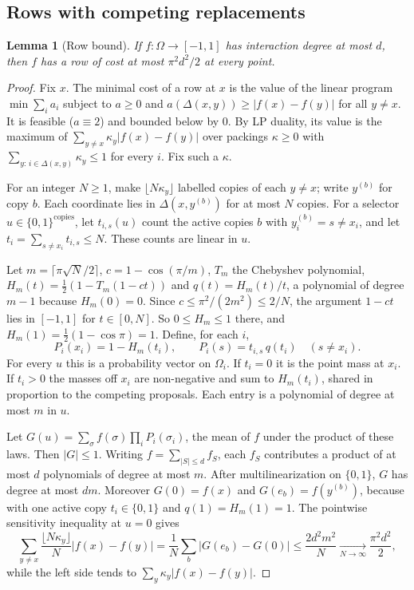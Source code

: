\documentclass[11pt]{article}
\numberwithin{equation}{section}
\newtheorem{lemma}[theorem]{Lemma}
\theoremstyle{definition}
\theoremstyle{remark}
\newcommand{\1}{\mathbf 1}
\begin{document}
\subsection{Rows with competing replacements}
\begin{lemma}[Row bound]\label{lem:rowbound}
If $f:\Omega\to[-1,1]$ has interaction degree at most $d$, then $f$ has a row of cost at most $\pi^2d^2/2$ at every point.
\end{lemma}
\begin{proof}
Fix $x$. The minimal cost of a row at $x$ is the value of the linear program $\min\sum_ia_i$ subject to $a\ge0$ and $a(\Delta(x,y))\ge|f(x)-f(y)|$ for all $y\ne x$. It is feasible ($a\equiv2$) and bounded below by $0$. By LP duality, its value is the maximum of $\sum_{y\ne x}\kappa_y|f(x)-f(y)|$ over packings $\kappa\ge0$ with $\sum_{y:\,i\in\Delta(x,y)}\kappa_y\le1$ for every $i$. Fix such a $\kappa$.

For an integer $N\ge1$, make $\lfloor N\kappa_y\rfloor$ labelled copies of each $y\ne x$; write $y^{(b)}$ for copy $b$. Each coordinate lies in $\Delta(x,y^{(b)})$ for at most $N$ copies. For a selector $u\in\{0,1\}^{\mathrm{copies}}$, let $t_{i,s}(u)$ count the active copies $b$ with $y^{(b)}_i=s\ne x_i$, and let $t_i=\sum_{s\ne x_i}t_{i,s}\le N$. These counts are linear in $u$.

Let $m=\lceil\pi\sqrt N/2\rceil$, $c=1-\cos(\pi/m)$, $T_m$ the Chebyshev polynomial, $H_m(t)=\frac12(1-T_m(1-ct))$ and $q(t)=H_m(t)/t$, a polynomial of degree $m-1$ because $H_m(0)=0$. Since $c\le\pi^2/(2m^2)\le2/N$, the argument $1-ct$ lies in $[-1,1]$ for $t\in[0,N]$. So $0\le H_m\le1$ there, and $H_m(1)=\frac12(1-\cos\pi)=1$. Define, for each $i$,
\[
P_i(x_i)=1-H_m(t_i),\qquad P_i(s)=t_{i,s}\,q(t_i)\quad(s\ne x_i).
\]
For every $u$ this is a probability vector on $\Omega_i$. If $t_i=0$ it is the point mass at $x_i$. If $t_i>0$ the masses off $x_i$ are non-negative and sum to $H_m(t_i)$, shared in proportion to the competing proposals. Each entry is a polynomial of degree at most $m$ in $u$.

Let $G(u)=\sum_\sigma f(\sigma)\prod_iP_i(\sigma_i)$, the mean of $f$ under the product of these laws. Then $|G|\le1$. Writing $f=\sum_{|S|\le d}f_S$, each $f_S$ contributes a product of at most $d$ polynomials of degree at most $m$. After multilinearization on $\{0,1\}$, $G$ has degree at most $dm$. Moreover $G(0)=f(x)$ and $G(e_b)=f(y^{(b)})$, because with one active copy $t_i\in\{0,1\}$ and $q(1)=H_m(1)=1$. The pointwise sensitivity inequality at $u=0$ gives
\[
\sum_{y\ne x}\frac{\lfloor N\kappa_y\rfloor}{N}|f(x)-f(y)|=\frac1N\sum_b|G(e_b)-G(0)|\le\frac{2d^2m^2}{N}\xrightarrow[N\to\infty]{}\frac{\pi^2d^2}{2},
\]
while the left side tends to $\sum_y\kappa_y|f(x)-f(y)|$.
\end{proof}
\end{document}
